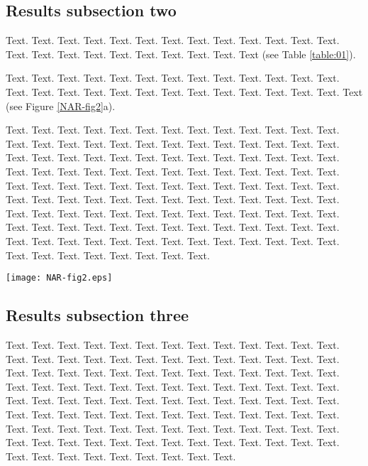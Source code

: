 \documentclass[a4,center,fleqn]{NAR}
\begin{document}
\subsection{Results subsection two}

Text.  Text. Text. Text. Text. Text. Text. Text. Text. Text. Text.
Text. Text. Text. Text. Text. Text. Text. Text. Text. Text. Text.
Text (see Table \ref{table:01}).

Text. Text. Text. Text. Text. Text.
Text. Text. Text. Text. Text. Text. Text. Text. Text. Text. Text.
Text. Text. Text. Text. Text. Text. Text. Text. Text.
Text (see Figure \ref{NAR-fig2}a).

Text. Text. Text. Text. Text.
Text. Text. Text. Text. Text. Text. Text. Text. Text. Text. Text.
Text. Text. Text. Text. Text. Text. Text. Text. Text. Text. Text.
Text. Text. Text. Text. Text. Text. Text. Text. Text. Text. Text.
Text. Text. Text. Text. Text. Text. Text. Text. Text. Text. Text.
Text. Text. Text. Text. Text. Text. Text. Text. Text. Text. Text.
Text. Text. Text. Text. Text. Text. Text. Text. Text. Text. Text.
Text. Text. Text. Text. Text. Text. Text. Text. Text. Text. Text.
Text. Text. Text. Text. Text. Text. Text. Text. Text. Text. Text.
Text. Text. Text. Text. Text. Text. Text. Text. Text. Text. Text.
Text. Text. Text. Text. Text. Text. Text. Text. Text. Text. Text.
Text. Text. Text. Text. Text. Text. Text. Text. Text. Text.

\begin{figure*}[t]
\begin{center}
\texttt{[image: NAR-fig2.eps]}
\end{center}
\caption{Caption for wide figure over two columns.
\textbf{(a)} Left figure.
\textbf{(b)} Right figure (see (a)).
}
\label{NAR-fig2}
\end{figure*}


\subsection{Results subsection three}

Text. Text. Text. Text. Text. Text. Text. Text. Text. Text. Text.
Text. Text. Text. Text. Text. Text. Text. Text. Text. Text. Text.
Text. Text. Text. Text. Text. Text. Text. Text. Text. Text. Text.
Text. Text. Text. Text. Text. Text. Text. Text. Text. Text. Text.
Text. Text. Text. Text. Text. Text. Text. Text. Text. Text. Text.
Text. Text. Text. Text. Text. Text. Text. Text. Text. Text. Text.
Text. Text. Text. Text. Text. Text. Text. Text. Text. Text. Text.
Text. Text. Text. Text. Text. Text. Text. Text. Text. Text. Text.
Text. Text. Text. Text. Text. Text. Text. Text. Text. Text. Text.
Text. Text. Text. Text. Text. Text. Text. Text. Text. Text. Text.
Text. Text. Text.
\end{document}
